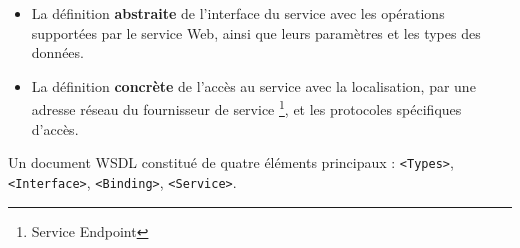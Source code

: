 	\SpecialItem 
	\begin{itemize}  %
	    \item La définition \textbf{abstraite} de l'interface du service avec les opérations supportées par
		le service Web, ainsi que leurs paramètres et les types des données.

	    \item La définition \textbf{concrète} de l'accès au service avec la localisation, par une adresse
		réseau du fournisseur de service \footnote{Service Endpoint}, et les protocoles spécifiques d'accès.
	\end{itemize}
	\newpage
	Un document \textsc{WSDL} constitué de quatre éléments principaux \cite{chinnici2007web}: 
	\texttt{<Types>}, \texttt{<Interface>}, \texttt{<Binding>}, \texttt{<Service>}.


